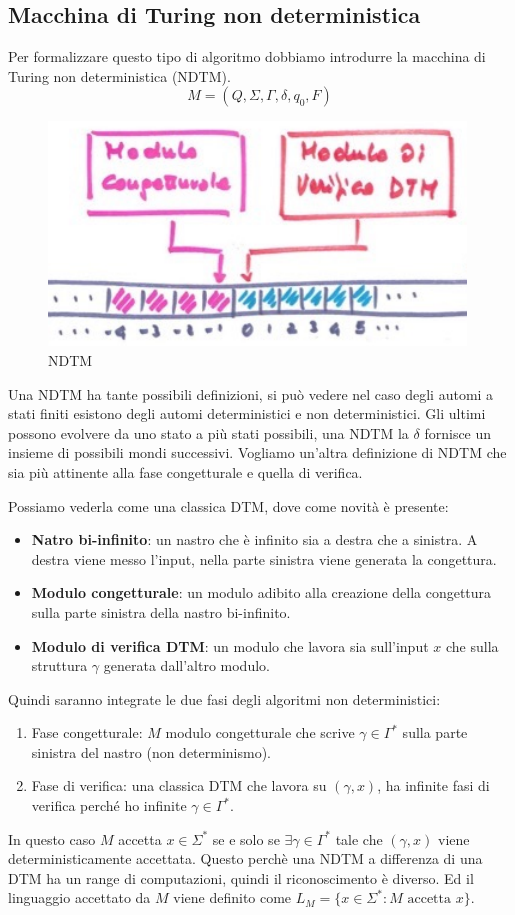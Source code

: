 \documentclass{article}
\begin{document}
\subsection{Macchina di Turing non deterministica}
Per formalizzare questo tipo di algoritmo dobbiamo introdurre la macchina di Turing
non deterministica (NDTM).
$$M=(Q,\Sigma,\Gamma,\delta,q_0,F)$$
\begin{figure}[H]
    \centering
    \includegraphics[scale=0.6]{images/ndtm.png}
    \caption{NDTM}
\end{figure}
Una NDTM ha tante possibili definizioni, si può vedere nel caso degli automi a stati finiti
esistono degli automi deterministici e non deterministici. Gli ultimi possono evolvere da uno
stato a più stati possibili, una NDTM la $\delta$ fornisce un insieme di possibili mondi
successivi. Vogliamo un'altra definizione di NDTM che sia più attinente alla fase
congetturale e quella di verifica.

Possiamo vederla come una classica DTM, dove come novità è presente:
\begin{itemize}
    \item \textbf{Natro bi-infinito}: un nastro che è infinito sia a destra
    che a sinistra. A destra viene messo l'input, nella parte sinistra viene
    generata la congettura.
    \item \textbf{Modulo congetturale}: un modulo adibito alla creazione
    della congettura sulla parte sinistra della nastro bi-infinito.
    \item \textbf{Modulo di verifica DTM}: un modulo che lavora sia sull'input $x$
    che sulla struttura $\gamma$ generata dall'altro modulo.
\end{itemize}
Quindi saranno integrate le due fasi degli algoritmi non deterministici:
\begin{enumerate}
    \item Fase congetturale: $M$ modulo congetturale che scrive $\gamma\in\Gamma^*$ sulla
    parte sinistra del nastro (non determinismo).
    \item Fase di verifica: una classica DTM che lavora su $(\gamma,x)$, ha infinite
    fasi di verifica perché ho infinite $\gamma\in\Gamma^*$.
\end{enumerate}
In questo caso $M$ accetta $x\in\Sigma^*$ se e solo se $\exists\gamma\in\Gamma^*$ tale
che $(\gamma,x)$ viene deterministicamente accettata.
Questo perchè una NDTM a differenza di una DTM ha un range di computazioni, quindi
il riconoscimento è diverso.
Ed il linguaggio accettato da $M$ viene definito come $L_M=\{x\in\Sigma^*:M\text{ accetta }x\}$.
\end{document}
